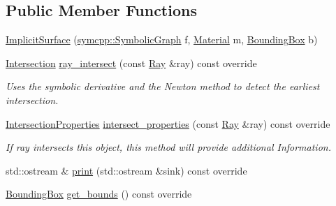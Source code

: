 \subsection*{Public Member Functions}
\begin{DoxyCompactItemize}
\item 
\mbox{\hyperlink{classImplicitSurface_ab0cfa235e8f935a416c395cfecd2f32b}{Implicit\+Surface}} (\mbox{\hyperlink{classsymcpp_1_1SymbolicGraph}{symcpp\+::\+Symbolic\+Graph}} f, \mbox{\hyperlink{classMaterial}{Material}} m, \mbox{\hyperlink{classBoundingBox}{Bounding\+Box}} b)
\item 
\mbox{\hyperlink{classIntersection}{Intersection}} \mbox{\hyperlink{classImplicitSurface_ad9443ffe39f5c3d65e009aa2dbda81f0}{ray\+\_\+intersect}} (const \mbox{\hyperlink{classRay}{Ray}} \&ray) const override
\begin{DoxyCompactList}\small\item\em Uses the symbolic derivative and the Newton method to detect the earliest intersection. \end{DoxyCompactList}\item 
\mbox{\hyperlink{classIntersectionProperties}{Intersection\+Properties}} \mbox{\hyperlink{classImplicitSurface_a13aa500c7dbcd75e77b43fba741b1ec8}{intersect\+\_\+properties}} (const \mbox{\hyperlink{classRay}{Ray}} \&ray) const override
\begin{DoxyCompactList}\small\item\em If ray intersects this object, this method will provide additional Information. \end{DoxyCompactList}\item 
std\+::ostream \& \mbox{\hyperlink{classImplicitSurface_a2267c88829c97c12ff8f7d250ce94802}{print}} (std\+::ostream \&sink) const override
\item 
\mbox{\hyperlink{classBoundingBox}{Bounding\+Box}} \mbox{\hyperlink{classImplicitSurface_a30f0b97eb9976f8e40be7b990d6352d6}{get\+\_\+bounds}} () const override
\end{DoxyCompactItemize}
